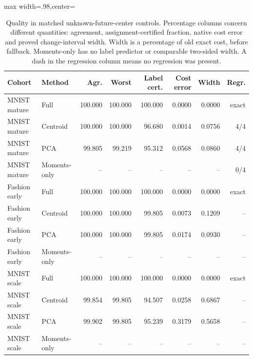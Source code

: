 \begin{table}[tbp]
\centering
\caption{Quality in matched unknown-future-center controls. Percentage columns concern different quantities: agreement, assignment-certified fraction, native cost error and proved change-interval width. Width is a percentage of old exact cost, before fallback. Moments-only has no label predictor or comparable two-sided width. A dash in the regression column means no regression was present.}
\label{tab:matched-quality}
\begin{adjustbox}{max width=.98\textwidth,center=\textwidth}
\begin{tabular}{llrrrrrr}
\toprule
Cohort & Method & Agr. & Worst & Label cert. & Cost error & Width & Regr.\\
\midrule
MNIST mature & Full & 100.000 & 100.000 & 100.000 & 0.0000 & 0.0000 & exact\\
MNIST mature & Centroid & 100.000 & 100.000 & 96.680 & 0.0014 & 0.0756 & 4/4\\
MNIST mature & PCA & 99.805 & 99.219 & 95.312 & 0.0568 & 0.0860 & 4/4\\
MNIST mature & Moments-only & -- & -- & -- & -- & -- & 0/4\\
Fashion early & Full & 100.000 & 100.000 & 100.000 & 0.0000 & 0.0000 & exact\\
Fashion early & Centroid & 100.000 & 100.000 & 99.805 & 0.0073 & 0.1209 & --\\
Fashion early & PCA & 100.000 & 100.000 & 99.805 & 0.0174 & 0.0930 & --\\
Fashion early & Moments-only & -- & -- & -- & -- & -- & --\\
MNIST scale & Full & 100.000 & 100.000 & 100.000 & 0.0000 & 0.0000 & exact\\
MNIST scale & Centroid & 99.854 & 99.805 & 94.507 & 0.0258 & 0.6867 & --\\
MNIST scale & PCA & 99.902 & 99.805 & 95.239 & 0.3179 & 0.5658 & --\\
MNIST scale & Moments-only & -- & -- & -- & -- & -- & --\\
\bottomrule
\end{tabular}
\end{adjustbox}
\end{table}
